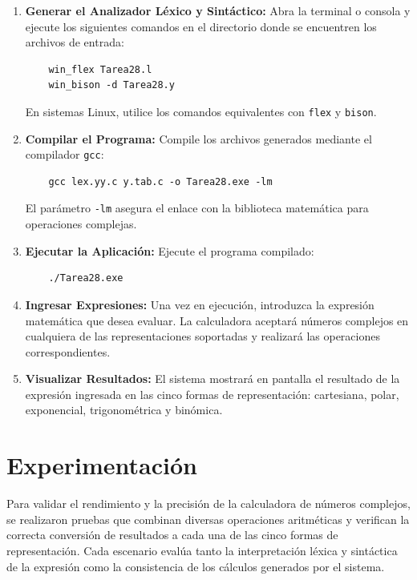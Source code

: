 \documentclass{article}
\begin{document}
\begin{enumerate}
    \item \textbf{Generar el Analizador Léxico y Sintáctico:}  
    Abra la terminal o consola y ejecute los siguientes comandos en el directorio donde se encuentren los archivos de entrada:
    \begin{verbatim}
    win_flex Tarea28.l
    win_bison -d Tarea28.y
    \end{verbatim}
    En sistemas Linux, utilice los comandos equivalentes con \texttt{flex} y \texttt{bison}.

    \item \textbf{Compilar el Programa:}  
    Compile los archivos generados mediante el compilador \texttt{gcc}:
    \begin{verbatim}
    gcc lex.yy.c y.tab.c -o Tarea28.exe -lm
    \end{verbatim}
    El parámetro \texttt{-lm} asegura el enlace con la biblioteca matemática para operaciones complejas.

    \item \textbf{Ejecutar la Aplicación:}  
    Ejecute el programa compilado:
    \begin{verbatim}
    ./Tarea28.exe
    \end{verbatim}

    \item \textbf{Ingresar Expresiones:}  
    Una vez en ejecución, introduzca la expresión matemática que desea evaluar. La calculadora aceptará números complejos en cualquiera de las representaciones soportadas y realizará las operaciones correspondientes.

    \item \textbf{Visualizar Resultados:}  
    El sistema mostrará en pantalla el resultado de la expresión ingresada en las cinco formas de representación: cartesiana, polar, exponencial, trigonométrica y binómica.
\end{enumerate}


\section{Experimentación}\label{sec:exp}

Para validar el rendimiento y la precisión de la calculadora de números complejos, se realizaron pruebas que combinan diversas operaciones aritméticas y verifican la correcta conversión de resultados a cada una de las cinco formas de representación. Cada escenario evalúa tanto la interpretación léxica y sintáctica de la expresión como la consistencia de los cálculos generados por el sistema.
\end{document}
